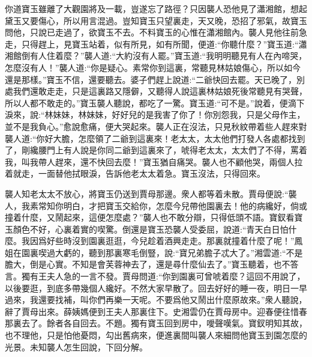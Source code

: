 \begin{parag}
    你道寶玉雖離了大觀園將及一載，豈遂忘了路徑？只因襲人恐他見了瀟湘館，想起黛玉又要傷心，所以用言混過。豈知寶玉只望裏走，天又晚，恐招了邪氣，故寶玉問他，只說已走過了，欲寶玉不去。不料寶玉的心惟在瀟湘館內。襲人見他往前急走，只得趕上，見寶玉站着，似有所見，如有所聞，便道:“你聽什麼？”寶玉道:“瀟湘館倒有人住着麼？”襲人道:“大約沒有人罷。”寶玉道:“我明明聽見有人在內啼哭，怎麼沒有人！”襲人道:“你是疑心。素常你到這裏，常聽見林姑娘傷心，所以如今還是那樣。”寶玉不信，還要聽去。婆子們趕上說道:“二爺快回去罷。天已晚了，別處我們還敢走走，只是這裏路又隱僻，又聽得人說這裏林姑娘死後常聽見有哭聲，所以人都不敢走的。”寶玉襲人聽說，都吃了一驚。寶玉道:“可不是。”說着，便滴下淚來，說:“林妹妹，林妹妹，好好兒的是我害了你了！你別怨我，只是父母作主，並不是我負心。”愈說愈痛，便大哭起來。襲人正在沒法，只見秋紋帶着些人趕來對襲人道:“你好大膽，怎麼領了二爺到這裏來！老太太，太太他們打發人各處都找到了，剛纔腰門上有人說是你同二爺到這裏來了，唬得老太太，太太們了不得，罵着我，叫我帶人趕來，還不快回去麼！”寶玉猶自痛哭。襲人也不顧他哭，兩個人拉着就走，一面替他拭眼淚，告訴他老太太着急。寶玉沒法，只得回來。
\end{parag}


\begin{parag}
    襲人知老太太不放心，將寶玉仍送到賈母那邊。衆人都等着未散。賈母便說:“襲人，我素常知你明白，才把寶玉交給你，怎麼今兒帶他園裏去！他的病纔好，倘或撞着什麼，又鬧起來，這便怎麼處？”襲人也不敢分辯，只得低頭不語。寶釵看寶玉顏色不好，心裏着實的喫驚。倒還是寶玉恐襲人受委屈，說道:“青天白日怕什麼。我因爲好些時沒到園裏逛逛，今兒趁着酒興走走。那裏就撞着什麼了呢！”鳳姐在園裏喫過大虧的，聽到那裏寒毛倒豎，說:“寶兄弟膽子忒大了。”湘雲道:“不是膽大，倒是心實。不知是會芙蓉神去了，還是尋什麼仙去了。”寶玉聽着，也不答言。獨有王夫人急的一言不發。賈母問道:“你到園裏可曾唬着麼？這回不用說了，以後要逛，到底多帶幾個人纔好。不然大家早散了。回去好好的睡一夜，明日一早過來，我還要找補，叫你們再樂一天呢。不要爲他又鬧出什麼原故來。”衆人聽說，辭了賈母出來。薛姨媽便到王夫人那裏住下。史湘雲仍在賈母房中。迎春便往惜春那裏去了。餘者各自回去。不題。獨有寶玉回到房中，噯聲嘆氣。寶釵明知其故，也不理他，只是怕他憂悶，勾出舊病來，便進裏間叫襲人來細問他寶玉到園怎麼的光景。未知襲人怎生回說，下回分解。
\end{parag}